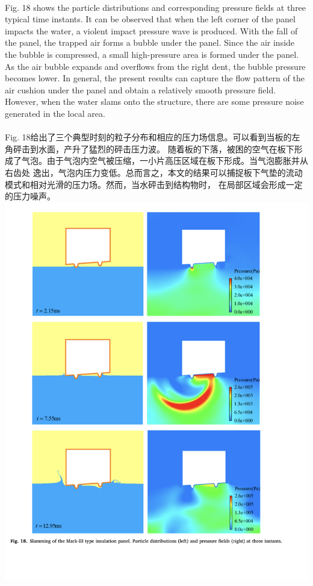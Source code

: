 \documentclass[UTF8]{ctexart}
\begin{document}
\paragraph{\quad}Fig. 18 shows the particle distributions and corresponding pressure fields at three 
                typical time instants. It can be observed that when the left corner of the panel impacts 
                the water, a violent impact pressure wave is produced. With the fall of the panel, the 
                trapped air forms a bubble under the panel. Since the air inside the bubble is compressed, 
                a small high-pressure area is formed under the panel. As the air bubble expands and overflows 
                from the right dent, the bubble pressure becomes lower. In general, the present results can 
                capture the flow pattern of the air cushion under the panel and obtain a relatively smooth 
                pressure field. However, when the water slams onto the structure, there are some pressure 
                noise generated in the local area.
\paragraph{\quad}Fig. 18给出了三个典型时刻的粒子分布和相应的压力场信息。可以看到当板的左角砰击到水面，产升了猛烈的砰击压力波。
                随着板的下落，被困的空气在板下形成了气泡。由于气泡内空气被压缩，一小片高压区域在板下形成。当气泡膨胀并从右齿处
                逸出，气泡内压力变低。总而言之，本文的结果可以捕捉板下气垫的流动模式和相对光滑的压力场。然而，当水砰击到结构物时，
                在局部区域会形成一定的压力噪声。
{
    \centering
    \includegraphics{./source/Fig18.png}
}
\end{document}
